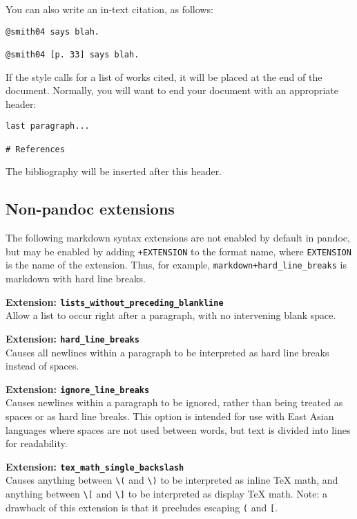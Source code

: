 \documentclass[]{article}
\begin{document}
You can also write an in-text citation, as follows:

\begin{verbatim}
@smith04 says blah.

@smith04 [p. 33] says blah.
\end{verbatim}

If the style calls for a list of works cited, it will be placed at the
end of the document. Normally, you will want to end your document with
an appropriate header:

\begin{verbatim}
last paragraph...

# References
\end{verbatim}

The bibliography will be inserted after this header.

\subsection{Non-pandoc extensions}\label{non-pandoc-extensions}

The following markdown syntax extensions are not enabled by default in
pandoc, but may be enabled by adding \texttt{+EXTENSION} to the format
name, where \texttt{EXTENSION} is the name of the extension. Thus, for
example, \texttt{markdown+hard\_line\_breaks} is markdown with hard line
breaks.

\textbf{Extension: \texttt{lists\_without\_preceding\_blankline}}\\Allow
a list to occur right after a paragraph, with no intervening blank
space.

\textbf{Extension: \texttt{hard\_line\_breaks}}\\Causes all newlines
within a paragraph to be interpreted as hard line breaks instead of
spaces.

\textbf{Extension: \texttt{ignore\_line\_breaks}}\\Causes newlines
within a paragraph to be ignored, rather than being treated as spaces or
as hard line breaks. This option is intended for use with East Asian
languages where spaces are not used between words, but text is divided
into lines for readability.

\textbf{Extension: \texttt{tex\_math\_single\_backslash}}\\Causes
anything between \texttt{\textbackslash{}(} and
\texttt{\textbackslash{})} to be interpreted as inline TeX math, and
anything between \texttt{\textbackslash{}{[}} and
\texttt{\textbackslash{}{]}} to be interpreted as display TeX math.
Note: a drawback of this extension is that it precludes escaping
\texttt{(} and \texttt{{[}}.
\end{document}
